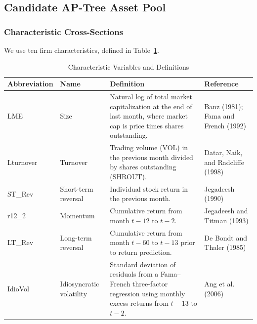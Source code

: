 \documentclass[12pt]{article}
\begin{document}
\subsection{Candidate AP-Tree Asset Pool}
\label{subsec:ap_candidate_pool}

\subsubsection{Characteristic Cross-Sections}

We use ten firm characteristics, defined in Table~\ref{tab:characteristic_definitions}.

\begin{table}[htbp]
  \centering
  \caption{Characteristic Variables and Definitions}
  \label{tab:characteristic_definitions}
  \small
  \renewcommand{\arraystretch}{1.35}
  \setlength{\tabcolsep}{5pt}
  \begin{threeparttable}
    \begin{tabular}{
      >{\raggedright\arraybackslash}p{}
      >{\raggedright\arraybackslash}p{}
      >{\raggedright\arraybackslash}p{}
      >{\raggedright\arraybackslash}p{}
    }
      \toprule
      Abbreviation & Name & Definition & Reference \\
      \midrule
      LME
      & Size
      & Natural log of total market capitalization at the end of last month, where market cap is price times shares outstanding.
      & Banz (1981); Fama and French (1992) \\

      Lturnover
      & Turnover
      & Trading volume (VOL) in the previous month divided by shares outstanding (SHROUT).
      & Datar, Naik, and Radcliffe (1998) \\

      ST\_Rev
      & Short-term reversal
      & Individual stock return in the previous month.
      & Jegadeesh (1990) \\

      r12\_2
      & Momentum
      & Cumulative return from month \(t-12\) to \(t-2\).
      & Jegadeesh and Titman (1993) \\

      LT\_Rev
      & Long-term reversal
      & Cumulative return from month \(t-60\) to \(t-13\) prior to return prediction.
      & De Bondt and Thaler (1985) \\

      IdioVol
      & Idiosyncratic volatility
      & Standard deviation of residuals from a Fama--French three-factor regression using monthly excess returns from \(t-13\) to \(t-2\).
      & Ang et al. (2006) \\


\end{tabular}
\end{threeparttable}
\end{table}
\end{document}
